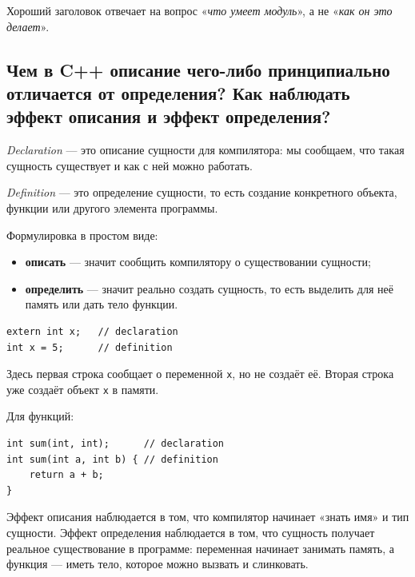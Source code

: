 \begin{remark}
Хороший заголовок отвечает на вопрос «\emph{что умеет модуль}», а не «\emph{как он это делает}».
\end{remark}

\subsection{Чем в C++ описание чего-либо принципиально отличается от определения? Как наблюдать эффект описания и эффект определения?}
\begin{definition}[Declaration]
\textit{Declaration} — это описание сущности для компилятора: мы сообщаем, что такая сущность существует и как с ней можно работать.
\end{definition}

\begin{definition}[Definition]
\textit{Definition} — это определение сущности, то есть создание конкретного объекта, функции или другого элемента программы.
\end{definition}

Формулировка в простом виде:
\begin{itemize}
    \item \textbf{описать} — значит сообщить компилятору о существовании сущности;
    \item \textbf{определить} — значит реально создать сущность, то есть выделить для неё память или дать тело функции.
\end{itemize}

\begin{example}
\begin{verbatim}
extern int x;   // declaration
int x = 5;      // definition
\end{verbatim}
\end{example}

Здесь первая строка сообщает о переменной \texttt{x}, но не создаёт её. Вторая строка уже создаёт объект \texttt{x} в памяти.

Для функций:
\begin{verbatim}
int sum(int, int);      // declaration
int sum(int a, int b) { // definition
    return a + b;
}
\end{verbatim}

\begin{remark}
Эффект описания наблюдается в том, что компилятор начинает «знать имя» и тип сущности. Эффект определения наблюдается в том, что сущность получает реальное существование в программе: переменная начинает занимать память, а функция — иметь тело, которое можно вызвать и слинковать.
\end{remark}
